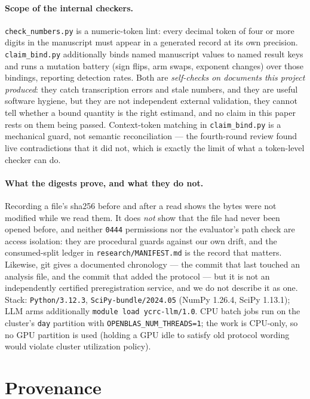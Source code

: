 \documentclass[11pt]{article}
\begin{document}
\paragraph{Scope of the internal checkers.}
\texttt{check\_numbers.py} is a numeric-token lint: every decimal token of four or more digits
in the manuscript must appear in a generated record at its own precision. \texttt{claim\_bind.py}
additionally binds named manuscript values to named result keys and runs a mutation battery
(sign flips, arm swaps, exponent changes) over those bindings, reporting detection rates. Both
are \emph{self-checks on documents this project produced}: they catch transcription errors and
stale numbers, and they are useful software hygiene, but they are not independent external
validation, they cannot tell whether a bound quantity is the right estimand, and no claim in this
paper rests on them being passed. Context-token matching in \texttt{claim\_bind.py} is a
mechanical guard, not semantic reconciliation --- the fourth-round review found live
contradictions that it did not, which is exactly the limit of what a token-level checker can do.

\paragraph{What the digests prove, and what they do not.} Recording a file's sha256 before
and after a read shows the bytes were not modified while we read them. It does \emph{not}
show that the file had never been opened before, and neither \texttt{0444} permissions nor
the evaluator's path check are access isolation: they are procedural guards against our own
drift, and the consumed-split ledger in \texttt{research/MANIFEST.md} is the record that
matters. Likewise, git gives a documented chronology --- the commit that last touched an
analysis file, and the commit that added the protocol --- but it is not an independently
certified preregistration service, and we do not describe it as one.
Stack: \texttt{Python/3.12.3}, \texttt{SciPy-bundle/2024.05} (NumPy 1.26.4, SciPy 1.13.1);
LLM arms additionally \texttt{module load ycrc-llm/1.0}. CPU batch jobs run on the
cluster's \texttt{day} partition with \texttt{OPENBLAS\_NUM\_THREADS=1}; the work is
CPU-only, so no GPU partition is used (holding a GPU idle to satisfy old protocol wording
would violate cluster utilization policy).

\section{Provenance}
\label{app:provenance}
\end{document}
